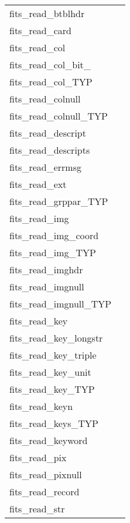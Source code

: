 \documentclass[11pt]{book}
\begin{document}
\begin{tabular}{lr}
fits\_read\_btblhdr      & \pageref{ffghbn} \\
fits\_read\_card         & \pageref{ffgcrd} \\
fits\_read\_col        & \pageref{ffgcv} \\
fits\_read\_col\_bit\_ & \pageref{ffgcx} \\
fits\_read\_col\_TYP    & \pageref{ffgcvx} \\
fits\_read\_colnull    & \pageref{ffgcf} \\
fits\_read\_colnull\_TYP    & \pageref{ffgcfx} \\
fits\_read\_descript & \pageref{ffgdes} \\
fits\_read\_descripts & \pageref{ffgdes} \\
fits\_read\_errmsg    & \pageref{ffgmsg} \\
fits\_read\_ext        & \pageref{ffgextn} \\
fits\_read\_grppar\_TYP  & \pageref{ffggpx} \\
fits\_read\_img         & \pageref{ffgpv} \\
fits\_read\_img\_coord & \pageref{ffgics} \\
fits\_read\_img\_TYP     & \pageref{ffgpvx} \\
fits\_read\_imghdr       & \pageref{ffghpr} \\
fits\_read\_imgnull & \pageref{ffgpf} \\
fits\_read\_imgnull\_TYP & \pageref{ffgpfx} \\
fits\_read\_key          & \pageref{ffgky} \\
fits\_read\_key\_longstr  & \pageref{ffgkls} \\
fits\_read\_key\_triple   & \pageref{ffgkyt} \\
fits\_read\_key\_unit     & \pageref{ffgunt} \\
fits\_read\_key\_TYP      & \pageref{ffgkyx} \\
fits\_read\_keyn         & \pageref{ffgkyn} \\
fits\_read\_keys\_TYP     & \pageref{ffgknx} \\
fits\_read\_keyword      & \pageref{ffgkey} \\
fits\_read\_pix  & \pageref{ffgpxv} \\
fits\_read\_pixnull & \pageref{ffgpxf} \\
fits\_read\_record       & \pageref{ffgrec} \\
fits\_read\_str         & \pageref{ffgcrd} \\

\end{tabular}
\end{document}
